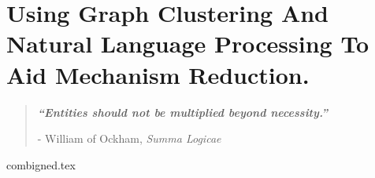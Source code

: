 

\chapter{ Using Graph Clustering And Natural Language Processing To Aid Mechanism Reduction. }\label{ch4}

\blankpage
\restoregeometry
\vspace*{0.15\paperheight}


\begin{center}
\begin{quotation}
  \large{\emph{\textbf{``Entities should not be multiplied beyond necessity.''} }  }  \\
  \begin{flushright}
  - William of Ockham, \textit{Summa Logicae}
  \end{flushright}
 \end{quotation}
\end{center}
\newpage

\doublespacing



{combigned.tex}

\chapterbib
